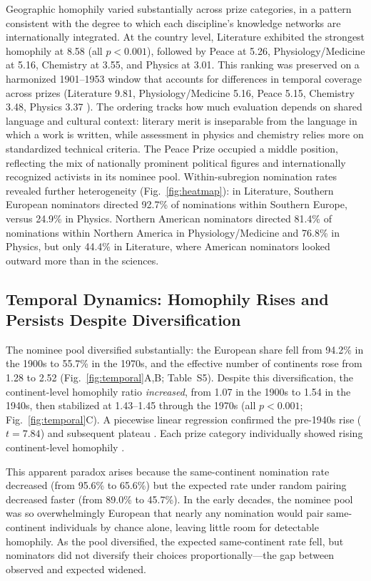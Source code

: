\documentclass[12pt]{article}
\begin{document}
Geographic homophily varied substantially across prize categories, in a pattern consistent with the degree to which each discipline's knowledge networks are internationally integrated. At the country level, Literature exhibited the strongest homophily at 8.58 (all $p < 0.001$), followed by Peace at 5.26, Physiology/Medicine at 5.16, Chemistry at 3.55, and Physics at 3.01. This ranking was preserved on a harmonized 1901--1953 window that accounts for differences in temporal coverage across prizes (Literature 9.81, Physiology/Medicine 5.16, Peace 5.15, Chemistry 3.48, Physics 3.37 \cite{methods}). The ordering tracks how much evaluation depends on shared language and cultural context: literary merit is inseparable from the language in which a work is written, while assessment in physics and chemistry relies more on standardized technical criteria. The Peace Prize occupied a middle position, reflecting the mix of nationally prominent political figures and internationally recognized activists in its nominee pool. Within-subregion nomination rates revealed further heterogeneity (Fig.~\ref{fig:heatmap}): in Literature, Southern European nominators directed 92.7\% of nominations within Southern Europe, versus 24.9\% in Physics. Northern American nominators directed 81.4\% of nominations within Northern America in Physiology/Medicine and 76.8\% in Physics, but only 44.4\% in Literature, where American nominators looked outward more than in the sciences.

\subsection*{Temporal Dynamics: Homophily Rises and Persists Despite Diversification}

The nominee pool diversified substantially: the European share fell from 94.2\% in the 1900s to 55.7\% in the 1970s, and the effective number of continents rose from 1.28 to 2.52 (Fig.~\ref{fig:temporal}A,B; Table~S5). Despite this diversification, the continent-level homophily ratio \emph{increased}, from 1.07 in the 1900s to 1.54 in the 1940s, then stabilized at 1.43--1.45 through the 1970s (all $p < 0.001$; Fig.~\ref{fig:temporal}C). A piecewise linear regression confirmed the pre-1940s rise ($t = 7.84$) and subsequent plateau \cite{methods}. Each prize category individually showed rising continent-level homophily \cite{methods}.

This apparent paradox arises because the same-continent nomination rate decreased (from 95.6\% to 65.6\%) but the expected rate under random pairing decreased faster (from 89.0\% to 45.7\%). In the early decades, the nominee pool was so overwhelmingly European that nearly any nomination would pair same-continent individuals by chance alone, leaving little room for detectable homophily. As the pool diversified, the expected same-continent rate fell, but nominators did not diversify their choices proportionally---the gap between observed and expected widened.
\end{document}
